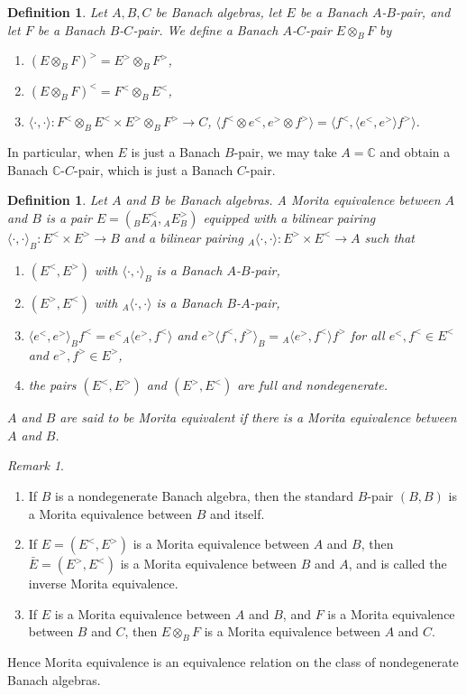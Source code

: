 \documentclass[a4,11pt]{amsart}
\newtheorem{defn}[thm]{Definition}
\theoremstyle{remark}
\newtheorem{rem}[thm]{Remark}
\begin{document}
\begin{defn}
Let $A,B,C$ be Banach algebras, let $E$ be a Banach $A$-$B$-pair, and let $F$ be a Banach $B$-$C$-pair. We define a Banach $A$-$C$-pair $E\otimes_B F$ by
\begin{enumerate}
\item $(E\otimes_B F)^>=E^>\otimes_B F^>$,
\item $(E\otimes_B F)^<=F^<\otimes_B E^<$,
\item $\langle \cdot,\cdot \rangle:F^<\otimes_B E^<\times E^>\otimes_B F^>\rightarrow C$, $\langle f^<\otimes e^<,e^>\otimes f^> \rangle=\langle f^<,\langle e^<,e^> \rangle f^> \rangle$.
\end{enumerate}
\end{defn}

In particular, when $E$ is just a Banach $B$-pair, we may take $A=\mathbb{C}$ and obtain a Banach $\mathbb{C}$-$C$-pair, which is just a Banach $C$-pair.

\begin{defn}
Let $A$ and $B$ be Banach algebras. A Morita equivalence between $A$ and $B$ is a pair $E=({}_B^{}E^<_A,{}_A^{}E^>_B)$ equipped with a bilinear pairing $\langle\cdot,\cdot\rangle_B:E^<\times E^>\rightarrow B$ and a bilinear pairing ${}_A\langle\cdot,\cdot\rangle:E^>\times E^<\rightarrow A$ such that
\begin{enumerate}
\item $(E^<,E^>)$ with $\langle\cdot,\cdot\rangle_B$ is a Banach $A$-$B$-pair,
\item $(E^>,E^<)$ with ${}_A\langle\cdot,\cdot\rangle$ is a Banach $B$-$A$-pair,
\item $\langle e^<,e^> \rangle_B f^<=e^< {}_A\langle e^>,f^< \rangle$ and $e^>\langle f^<,f^> \rangle_B={}_A\langle e^>,f^< \rangle f^>$ for all $e^<,f^<\in E^<$ and $e^>,f^>\in E^>$,
\item the pairs $(E^<,E^>)$ and $(E^>,E^<)$ are full and nondegenerate.
\end{enumerate}
$A$ and $B$ are said to be Morita equivalent if there is a Morita equivalence between $A$ and $B$.
\end{defn}

\begin{rem} \leavevmode
\begin{enumerate}
\item If $B$ is a nondegenerate Banach algebra, then the standard $B$-pair $(B,B)$ is a Morita equivalence between $B$ and itself.
\item If $E=(E^<,E^>)$ is a Morita equivalence between $A$ and $B$, then $\bar{E}=(E^>,E^<)$ is a Morita equivalence between $B$ and $A$, and is called the inverse Morita equivalence.
\item If $E$ is a Morita equivalence between $A$ and $B$, and $F$ is a Morita equivalence between $B$ and $C$, then $E\otimes_B F$ is a Morita equivalence between $A$ and $C$.
\end{enumerate}
Hence Morita equivalence is an equivalence relation on the class of nondegenerate Banach algebras.
\end{rem}
\end{document}
